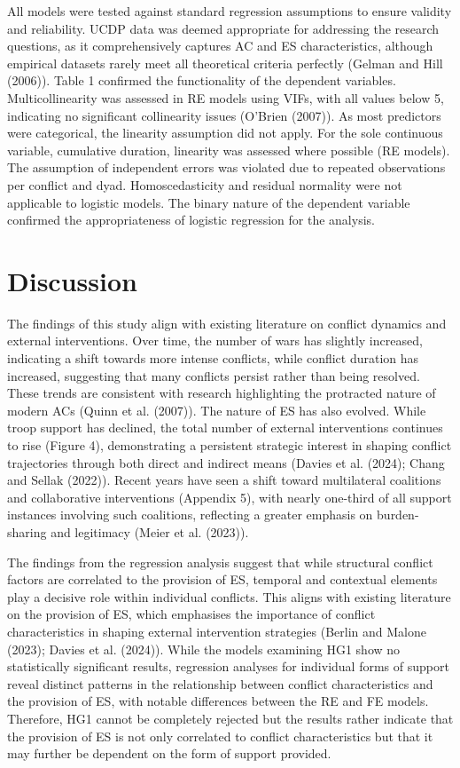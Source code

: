 \documentclass[
]{article}
\begin{document}
All models were tested against standard regression assumptions to ensure
validity and reliability. UCDP data was deemed appropriate for
addressing the research questions, as it comprehensively captures AC and
ES characteristics, although empirical datasets rarely meet all
theoretical criteria perfectly (Gelman and Hill (2006)). Table 1
confirmed the functionality of the dependent variables.
Multicollinearity was assessed in RE models using VIFs, with all values
below 5, indicating no significant collinearity issues (O'Brien (2007)).
As most predictors were categorical, the linearity assumption did not
apply. For the sole continuous variable, cumulative duration, linearity
was assessed where possible (RE models). The assumption of independent
errors was violated due to repeated observations per conflict and dyad.
Homoscedasticity and residual normality were not applicable to logistic
models. The binary nature of the dependent variable confirmed the
appropriateness of logistic regression for the analysis.

\section{Discussion}\label{discussion}

The findings of this study align with existing literature on conflict
dynamics and external interventions. Over time, the number of wars has
slightly increased, indicating a shift towards more intense conflicts,
while conflict duration has increased, suggesting that many conflicts
persist rather than being resolved. These trends are consistent with
research highlighting the protracted nature of modern ACs (Quinn et al.
(2007)). The nature of ES has also evolved. While troop support has
declined, the total number of external interventions continues to rise
(Figure 4), demonstrating a persistent strategic interest in shaping
conflict trajectories through both direct and indirect means (Davies et
al. (2024); Chang and Sellak (2022)). Recent years have seen a shift
toward multilateral coalitions and collaborative interventions (Appendix
5), with nearly one-third of all support instances involving such
coalitions, reflecting a greater emphasis on burden-sharing and
legitimacy (Meier et al. (2023)).

The findings from the regression analysis suggest that while structural
conflict factors are correlated to the provision of ES, temporal and
contextual elements play a decisive role within individual conflicts.
This aligns with existing literature on the provision of ES, which
emphasises the importance of conflict characteristics in shaping
external intervention strategies (Berlin and Malone (2023); Davies et
al. (2024)). While the models examining HG1 show no statistically
significant results, regression analyses for individual forms of support
reveal distinct patterns in the relationship between conflict
characteristics and the provision of ES, with notable differences
between the RE and FE models. Therefore, HG1 cannot be completely
rejected but the results rather indicate that the provision of ES is not
only correlated to conflict characteristics but that it may further be
dependent on the form of support provided.
\end{document}
